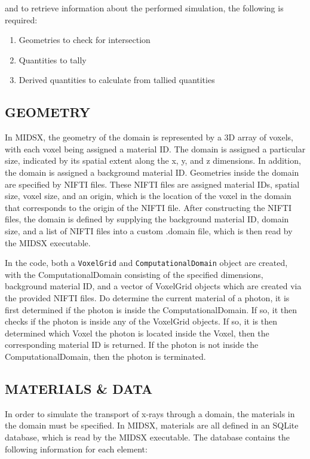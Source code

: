 \documentclass[%
 aip,
cp,  %
 amsmath,amssymb,%
reprint,%
]{revtex4-2}
\newcommand{\code}[1]{\texttt{#1}}
\begin{document}
and to retrieve information about the performed simulation, the following is required:

\begin{enumerate}
    \item Geometries to check for intersection
    \item Quantities to tally
    \item Derived quantities to calculate from tallied quantities
\end{enumerate}

\subsection{GEOMETRY}
\par In MIDSX, the geometry of the domain is represented by a 3D array of voxels, with each voxel being assigned a material ID. The domain is assigned a particular size, indicated by its spatial extent along the x, y, and z dimensions. In addition, the domain is assigned a background material ID. Geometries inside the domain are specified by NIFTI files. These NIFTI files are assigned material IDs, spatial size, voxel size, and an origin, which is the location of the voxel in the domain that corresponds to the origin of the NIFTI file. After constructing the NIFTI files, the domain is defined by supplying the background material ID, domain size, and a list of NIFTI files into a custom .domain file, which is then read by the MIDSX executable. \\
\par In the code, both a \code{VoxelGrid} and \code{ComputationalDomain} object are created, with the ComputationalDomain consisting of the specified dimensions, background material ID, and a vector of VoxelGrid objects which are created via the provided NIFTI files. Do determine the current material of a photon, it is first determined if the photon is inside the ComputationalDomain. If so, it then checks if the photon is inside any of the VoxelGrid objects. If so, it is then determined which Voxel the photon is located inside the Voxel, then the corresponding material ID is returned. If the photon is not inside the ComputationalDomain, then the photon is terminated. \\

\subsection{MATERIALS \& DATA}
\par In order to simulate the transport of x-rays through a domain, the materials in the domain must be specified. In MIDSX, materials are all defined in an SQLite database, which is read by the MIDSX executable. The database contains the following information for each element:
\end{document}
